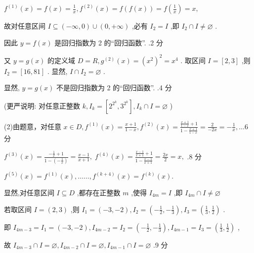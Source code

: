 \documentclass[10pt]{article}
\begin{document}
\({f}^{\left( 1\right) }\left( x\right)  = f\left( x\right)  = \frac{1}{x},{f}^{\left( 2\right) }\left( x\right)  = f\left( {f\left( x\right) }\right)  = f\left( \frac{1}{x}\right)  = x,\)

故对任意区间 \(I \subseteq  \left( {-\infty ,0}\right)  \cup  \left( {0, + \infty }\right)\) ,必有 \({I}_{2} = I\) ,即 \({I}_{2} \cap  I \neq  \varnothing\) .

因此 \(y = f\left( x\right)\) 是回归指数为 2 的“回归函数”. .2 分

又 \(y = g\left( x\right)\) 的定义域 \(D = R,{g}^{\left( 2\right) }\left( x\right)  = {\left( {x}^{2}\right) }^{2} = {x}^{4}\) . 取区间 \(I = \left\lbrack  {2,3}\right\rbrack\) ,则 \({I}_{2} = \left\lbrack  {{16},{81}}\right\rbrack\) . 显然, \(I \cap  {I}_{2} = \varnothing\) .

显然, \(y = g\left( x\right)\) 不是回归指数为 2 的“回归函数”. .4 分

(更严说明: 对任意正整数 \(k,{I}_{k} = \left\lbrack  {{2}^{{2}^{k}},{3}^{{2}^{k}}}\right\rbrack  ,{I}_{k} \cap  I = \varnothing\) )

(2)由题意，对任意 \(x \in  D,{f}^{\left( 1\right) }\left( x\right)  = \frac{x + 1}{1 - x},{f}^{\left( 2\right) }\left( x\right)  = \frac{\frac{x + 1}{1 - x} + 1}{1 - \frac{x + 1}{1 - x}} = \frac{2}{-{2x}} =  - \frac{1}{x},\ldots 6\) 分

\({f}^{\left( 3\right) }\left( x\right)  = \frac{-\frac{1}{x} + 1}{1 - \left( {-\frac{1}{x}}\right) } = \frac{x - 1}{x + 1},\;{f}^{\left( 4\right) }\left( x\right)  = \frac{\frac{x - 1}{x + 1} + 1}{1 - \frac{x - 1}{x + 1}} = \frac{2x}{2} = x,\) .8 分

\({f}^{\left( 5\right) }\left( x\right)  = {f}^{\left( 1\right) }\left( x\right) ,\ldots \ldots ,{f}^{\left( k + 4\right) }\left( x\right)  = {f}^{\left( k\right) }\left( x\right) .\)

显然,对任意区间 \(I \subseteq  D\) ,都存在正整数 \(m\) ,使得 \({I}_{4m} = I\) ,即 \({I}_{4m} \cap  I \neq  \varnothing\)

若取区间 \(I = \left( {2,3}\right)\) ,则 \({I}_{1} = \left( {-3, - 2}\right) ,{I}_{2} = \left( {-\frac{1}{2}, - \frac{1}{3}}\right) ,{I}_{3} = \left( {\frac{1}{3},\frac{1}{2}}\right)\) .

即 \({I}_{{4m} - 3} = {I}_{1} = \left( {-3, - 2}\right) ,{I}_{{4m} - 2} = {I}_{2} = \left( {-\frac{1}{2}, - \frac{1}{3}}\right) ,{I}_{{4m} - 1} = {I}_{3} = \left( {\frac{1}{3},\frac{1}{2}}\right)\) ,

故 \({I}_{{4m} - 3} \cap  I = \varnothing ,{I}_{{4m} - 2} \cap  I = \varnothing ,{I}_{{4m} - 1} \cap  I = \varnothing\) .9 分
\end{document}
